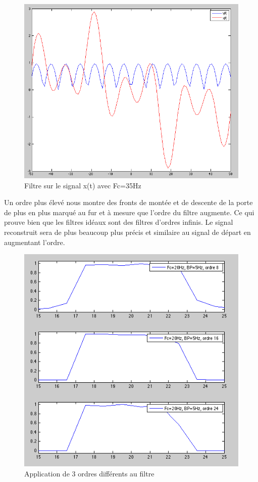 \documentclass[a4paper, oneside]{report}
\begin{document}
 \begin{figure}[h]
 \centering
 \includegraphics[scale=0.65]{images/fourier_inv35.png}
 \caption{Filtre sur le signal x(t) avec Fc=35Hz}
 \end{figure}
\newpage
Un ordre plus \'elev\'e nous montre des fronts de mont\'ee et de descente de la porte de plus en plus marqu\'e au fur et \`a mesure que l'ordre du filtre augmente. Ce qui prouve bien que les filtres id\'eaux sont des filtres d'ordres infinis.
Le signal reconstruit sera de plus beaucoup plus pr\'ecis et similaire au signal de d\'epart en augmentant l'ordre.

\begin{figure}[h]
\centering
\includegraphics[scale=0.8]{images/cheb_divers.png}
\caption{Application de 3 ordres diff\'erents au filtre}
\end{figure}
\end{document}
